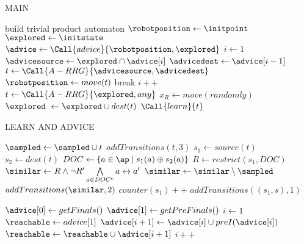 \begin{algorithm}
    \small
	\caption{MAIN}\label{alg:main}
	\begin{algorithmic}[1]
		\State build trivial product automaton
		\State $\robotposition \gets \initpoint$
		\State $\explored \gets \initstate$
			\State $\advice \gets \Call{advice}{\robotposition, \explored}$ 
			\State $i\gets 1$
				\State $\advicesource \gets \explored \cap \advice[i]$
				\State $\advicedest \gets \advice [i-1]$
				\State $t \gets \Call{A-RRG}{\advicesource, \advicedest}$ 
				    \State $\robotposition \gets move(t)$
					\State break
				\EndIf 
				\State $i++$
			\EndWhile
		    \State $t\gets \Call{A-RRG}{\explored, any}$
		        \State $x_R \gets move(randomly)$
		    \EndIf
		\EndIf
		\State $\explored\ \gets \explored \cup dest(t)$
		\State $\Call{learn}{t}$
		\State {}
		\EndIf
		\EndWhile
	\end{algorithmic}
\end{algorithm}

\begin{algorithm}
    \small
	\caption{LEARN AND ADVICE}\label{alg:learnandadvice}
	\begin{algorithmic}[1]
		\State $\sampled\gets \sampled \cup t$
		\State $addTransitions(t, 3)$
		\State $s_1 \gets source(t)$
		\State $s_2 \gets dest(t)$
		\State $DOC \gets \{a\in \ap \mid s_1(a)\oplus s_2(a)\}$
		\State $R\gets restrict(s_1,DOC)$
		\State $\similar \gets R \wedge \neg R' \bigwedge\limits_{a\in DOC^c} a\leftrightarrow a'$
		\State{}
		\State $\similar \gets \similar \setminus \sampled$
		\State $addTransitions(\similar, 2)$
		\State $counter(s_1)++$
			\State $addTransitions((s_1,s),1)$
		\EndFor
		\EndIf
		\EndProcedure
		
		
		\State $\advice[0] \gets getFinals()$
		\State $\advice[1] \gets getPreFinals()$
		\State $i\gets 1$
		\State $\reachable \gets advice[1]$
			\State $\advice[i+1] \gets \advice[i]\cup preI(\advice[i])$
			\State $\reachable \gets \reachable \cup \advice[i+1]$
			\State $i++$
		\EndWhile
		\State \Return{$\advice$}
		\EndProcedure
	\end{algorithmic}
\end{algorithm} 

